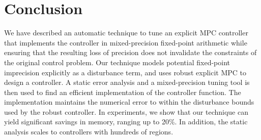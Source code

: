 \section{Conclusion}

We have described an automatic technique to tune an explicit MPC
controller that implements the controller in mixed-precision fixed-point arithmetic
while ensuring that the resulting loss of precision does not invalidate the
constraints of the original control problem.
Our technique models potential fixed-point imprecision explicitly as a disturbance
term, and uses robust explicit MPC to design a controller.
A static error analysis and a mixed-precision tuning tool is then 
used to find an efficient implementation of the controller function.
The implementation maintains the numerical error to within
the disturbance bounds used by the robust controller.
In experiments, we show that our technique can yield significant savings in memory,
ranging up to 20\%. 
In addition, the static analysis scales to controllers with hundreds of regions.

